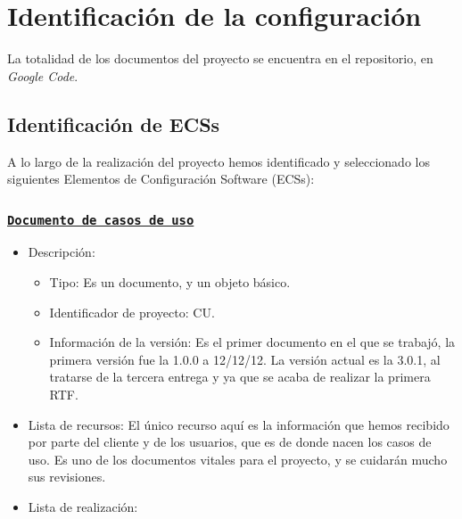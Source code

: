 \documentclass[spanish,a4paper,11pt, twoside]{report}	%
\begin{document}
	\section{Identificación de la configuración}
		La totalidad de los documentos del proyecto se encuentra en el repositorio, en \textit{Google Code}. 

		\subsection{Identificación de ECSs}
			
			
			A lo largo de la realización del proyecto hemos identificado y seleccionado los siguientes Elementos de Configuración Software (ECSs):
			
			\subsubsection{\texttt{\underline{Documento de casos de uso}}}
			\begin{itemize}	
				\item{Descripción:}
					\begin{itemize}	
						\item{Tipo:} Es un documento, y un objeto básico. 
						\item{Identificador de proyecto:} CU.
						\item{Información de la versión:} Es el primer documento en el que se trabajó, la primera versión fue la 1.0.0 a 12/12/12. La versión actual es la 3.0.1, al tratarse de la tercera entrega y ya que se acaba de realizar la primera RTF.
					\end{itemize}	
				\item{Lista de recursos:} El único recurso aquí es la información que hemos recibido por parte del cliente y de los usuarios, que es de donde nacen los casos de uso. Es uno de los documentos vitales para el proyecto, y se cuidarán mucho sus revisiones.
				\item{Lista de realización:}
			\end{itemize}		
\end{document}
